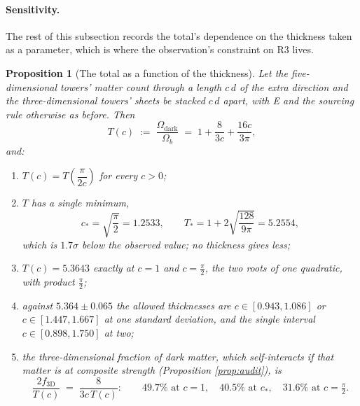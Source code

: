 \documentclass[11pt]{article}
\newtheorem{proposition}[theorem]{Proposition}
\theoremstyle{definition}
\begin{document}
\paragraph*{Sensitivity.} The rest of this subsection records the total's dependence on the thickness taken as a parameter, which is where the observation's constraint on R3 lives.

\begin{proposition}[The total as a function of the thickness]\label{prop:Tc}
Let the five-dimensional towers' matter count through a length $c\,d$ of the extra direction and the three-dimensional towers' sheets be stacked $c\,d$ apart, with E and the sourcing rule otherwise as before. Then
\[
T(c) \;:=\; \frac{\Omega_{\mathrm{dark}}}{\Omega_{b}} \;=\; 1 + \frac{8}{3c} + \frac{16c}{3\pi},
\]
and:
\begin{enumerate}
\item[(i)] $T(c) = T\!\left(\dfrac{\pi}{2c}\right)$ for every $c > 0$;
\item[(ii)] $T$ has a single minimum,
\[
c_{\ast} = \sqrt{\frac{\pi}{2}} = 1.2533, \qquad T_{\ast} = 1 + 2\sqrt{\frac{128}{9\pi}} = 5.2554,
\]
which is $1.7\sigma$ below the observed value; no thickness gives less;
\item[(iii)] $T(c) = 5.3643$ exactly at $c = 1$ and $c = \tfrac{\pi}{2}$, the two roots of one quadratic, with product $\tfrac{\pi}{2}$;
\item[(iv)] against $5.364 \pm 0.065$ the allowed thicknesses are $c \in [0.943, 1.086]$ or $c \in [1.447, 1.667]$ at one standard deviation, and the single interval $c \in [0.898, 1.750]$ at two;
\item[(v)] the three-dimensional fraction of dark matter, which self-interacts if that matter is at composite strength (Proposition \ref{prop:audit}), is
\[
\frac{2 f_{3\mathrm{D}}}{T(c)} \;=\; \frac{8}{3c\,T(c)} : \qquad 49.7\% \text{ at } c = 1, \quad 40.5\% \text{ at } c_{\ast}, \quad 31.6\% \text{ at } c = \tfrac{\pi}{2}.
\]
\end{enumerate}
\end{proposition}
\end{document}
